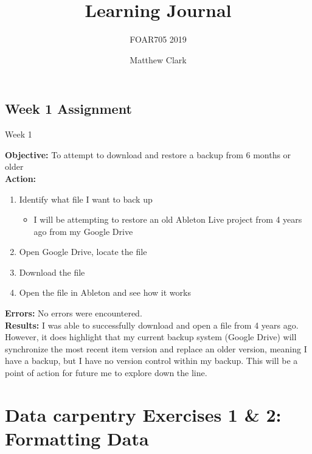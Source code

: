 \documentclass{article}
\title{Learning Journal}
\subtitle{FOAR705 2019}
\author{Matthew Clark}
\date{\vspace{-5ex}} %
\begin{document}
\maketitle
\newpage
\tableofcontents
\newpage
\begin{center}
\section{Week 1 Assignment}
Week 1
\end{center}
\noindent
\textbf{Objective:} To attempt to download and restore a backup from 6 months or older\\
\textbf{Action:}
\begin{enumerate}
    \item Identify what file I want to back up
    \begin{itemize}
        \item I will be attempting to restore an old Ableton Live project from 4 years ago from my Google Drive
    \end{itemize}
    \item Open Google Drive, locate the file
    \item Download the file
    \item Open the file in Ableton and see how it works
\end{enumerate}
\textbf{Errors:} No errors were encountered. \\
\textbf{Results:} I was able to successfully download and open a file from 4 years ago. However, it does highlight that my current backup system (Google Drive) will synchronize the most recent item version and replace an older version, meaning I have a backup, but I have no version control within my backup. This will be a point of action for future me to explore down the line.
\newpage
\section{Data carpentry Exercises 1 \& 2: Formatting Data}
\end{document}
